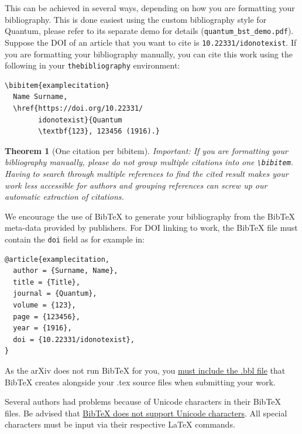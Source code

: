 \documentclass[a4paper,twocolumn,11pt]{quantumarticle}
\newtheorem{theorem}{Theorem}
\begin{document}
This can be achieved in several ways, depending on how you are formatting your bibliography.
This is done easiest using the custom bibliography style for Quantum,
please refer to its separate demo for details (\texttt{quantum\_bst\_demo.pdf}).
Suppose the DOI of an article \cite{examplecitation} that you want to cite is \texttt{10.22331/idonotexist}.
If you are formatting your bibliography manually, you can cite this work using the following in your \texttt{thebibliography} environment:
\begin{verbatim}
\bibitem{examplecitation}
  Name Surname,
  \href{https://doi.org/10.22331/
        idonotexist}{Quantum
        \textbf{123}, 123456 (1916).}
\end{verbatim}

\begin{theorem}[One citation per bibitem]
  Important: If you are formatting your bibliography manually, please do not group multiple citations into one \texttt{\textbackslash{}bibitem}.
  Having to search through multiple references to find the cited result makes your work less accessible for authors and grouping references can screw up our automatic extraction of citations.
\end{theorem}

We encourage the use of BibTeX to generate your bibliography from the BibTeX meta-data provided by publishers.
For DOI linking to work, the BibTeX file must contain the \texttt{doi} field as for example in:
\begin{verbatim}
@article{examplecitation,
  author = {Surname, Name},
  title = {Title},
  journal = {Quantum},
  volume = {123},
  page = {123456},
  year = {1916},
  doi = {10.22331/idonotexist},
}
\end{verbatim}
As the arXiv does not run BibTeX for you, you \href{https://arxiv.org/help/submit_tex}{must include the .bbl file} that BibTeX creates alongside your .tex source files when submitting your work.

Several authors had problems because of Unicode characters in their BibTeX files.
Be advised that \href{http://wiki.lyx.org/BibTeX/Tips}{BibTeX does not support Unicode characters}.
All special characters must be input via their respective LaTeX commands.
\end{document}

